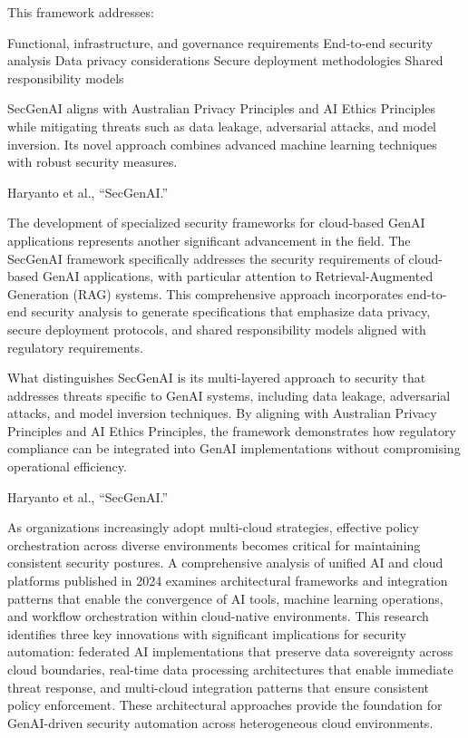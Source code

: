 This framework addresses:

Functional, infrastructure, and governance requirements
End-to-end security analysis
Data privacy considerations
Secure deployment methodologies
Shared responsibility models

SecGenAI aligns with Australian Privacy Principles and AI Ethics Principles while mitigating threats such as data leakage, adversarial attacks, and model inversion. Its novel approach combines advanced machine learning techniques with robust security measures.

Haryanto et al., “SecGenAI.”

The development of specialized security frameworks for cloud-based GenAI applications represents another significant advancement in the field. The SecGenAI framework specifically addresses the security requirements of cloud-based GenAI applications, with particular attention to Retrieval-Augmented Generation (RAG) systems. This comprehensive approach incorporates end-to-end security analysis to generate specifications that emphasize data privacy, secure deployment protocols, and shared responsibility models aligned with regulatory requirements.

What distinguishes SecGenAI is its multi-layered approach to security that addresses threats specific to GenAI systems, including data leakage, adversarial attacks, and model inversion techniques. By aligning with Australian Privacy Principles and AI Ethics Principles, the framework demonstrates how regulatory compliance can be integrated into GenAI implementations without compromising operational efficiency.

Haryanto et al., “SecGenAI.”

As organizations increasingly adopt multi-cloud strategies, effective policy orchestration across diverse environments becomes critical for maintaining consistent security postures. A comprehensive analysis of unified AI and cloud platforms published in 2024 examines architectural frameworks and integration patterns that enable the convergence of AI tools, machine learning operations, and workflow orchestration within cloud-native environments.
This research identifies three key innovations with significant implications for security automation: federated AI implementations that preserve data sovereignty across cloud boundaries, real-time data processing architectures that enable immediate threat response, and multi-cloud integration patterns that ensure consistent policy enforcement. These architectural approaches provide the foundation for GenAI-driven security automation across heterogeneous cloud environments.

